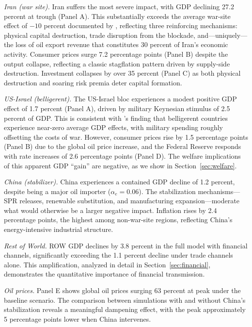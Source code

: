 \documentclass[12pt,a4paper]{article}
\begin{document}
\textit{Iran (war site).} Iran suffers the most severe impact, with GDP declining 27.2 percent at trough (Panel A). This substantially exceeds the average war-site effect of $-10$ percent documented by \citet{federle2026price}, reflecting three reinforcing mechanisms: physical capital destruction, trade disruption from the blockade, and---uniquely---the loss of oil export revenue that constitutes 30 percent of Iran's economic activity. Consumer prices surge 7.2 percentage points (Panel B) despite the output collapse, reflecting a classic stagflation pattern driven by supply-side destruction. Investment collapses by over 35 percent (Panel C) as both physical destruction and soaring risk premia deter capital formation.

\textit{US-Israel (belligerent).} The US-Israel bloc experiences a modest positive GDP effect of 1.7 percent (Panel A), driven by military Keynesian stimulus of 2.5 percent of GDP. This is consistent with \citeauthor{federle2026price}'s finding that belligerent countries experience near-zero average GDP effects, with military spending roughly offsetting the costs of war. However, consumer prices rise by 1.5 percentage points (Panel B) due to the global oil price increase, and the Federal Reserve responds with rate increases of 2.6 percentage points (Panel D). The welfare implications of this apparent GDP ``gain'' are negative, as we show in Section~\ref{sec:welfare}.

\textit{China (stabilizer).} China experiences a contained GDP decline of 1.2 percent, despite being a major oil importer ($\alpha_e = 0.06$). The stabilization mechanisms---SPR releases, renewable substitution, and manufacturing expansion---moderate what would otherwise be a larger negative impact. Inflation rises by 2.4 percentage points, the highest among non-war-site regions, reflecting China's energy-intensive industrial structure.

\textit{Rest of World.} ROW GDP declines by 3.8 percent in the full model with financial channels, significantly exceeding the 1.1 percent decline under trade channels alone. This amplification, analyzed in detail in Section~\ref{sec:financial}, demonstrates the quantitative importance of financial transmission.

\textit{Oil prices.} Panel E shows global oil prices surging 63 percent at peak under the baseline scenario. The comparison between simulations with and without China's stabilization reveals a meaningful dampening effect, with the peak approximately 5 percentage points lower when China intervenes.
\end{document}
